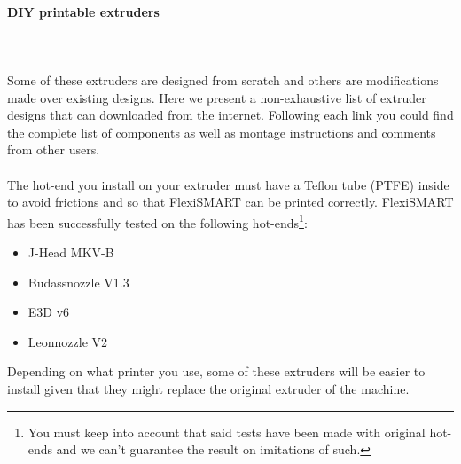 \documentclass[11pt,a4paper]{article}
\begin{document}
			\paragraph{DIY printable extruders}
\mbox{}\\\\
Some of these extruders are designed from scratch and others are modifications made over existing designs. Here we present a non-exhaustive list of extruder designs that can downloaded from the internet. Following each link you could find the complete list of components as well as montage instructions and comments from other users.
\\\\
The hot-end you install on your extruder must have a Teflon tube (PTFE) inside to avoid frictions and so that FlexiSMART can be printed correctly. FlexiSMART has been successfully tested on the following hot-ends\footnote{You must keep into account that said tests have been made with original hot-ends and we can’t guarantee the result on imitations of such.}:
\begin{itemize}
\item J-Head MKV-B
\item Budassnozzle V1.3
\item E3D v6
\item Leonnozzle V2
\end{itemize}
Depending on what printer you use, some of these extruders will be easier to install given that they might replace the original extruder of the machine.
\end{document}
